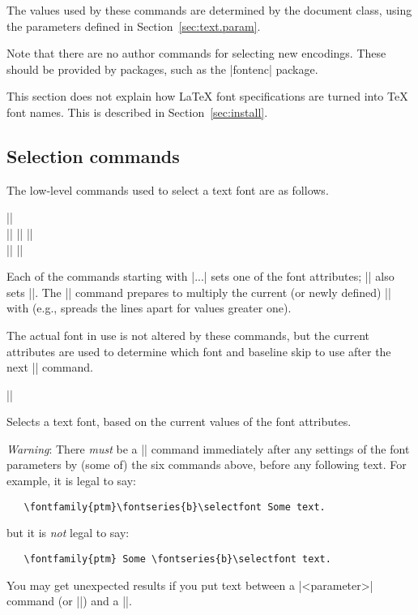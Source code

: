\documentclass{ltxguide}[1995/11/28]
\begin{document}
The values used by these commands are determined by the document class,
using the parameters defined in Section~\ref{sec:text.param}.

Note that there are no author commands for selecting new encodings.
These should be provided by packages, such as the |fontenc| package.

This section does not explain how \LaTeX{} font specifications are
turned into \TeX{} font names.  This is described in
Section~\ref{sec:install}.



\subsection{Selection commands}

The low-level commands used to select a text font are as follows.

\begin{decl}
  |\fontencoding|  \\
  |\fontfamily|   \qquad
  |\fontseries|  \qquad
  |\fontshape|  \\
  |\fontsize|   \qquad
  |\linespread| 
\end{decl}

Each of the commands starting with |\font...| sets one of the font
attributes; |\fontsize| also sets |\baselineskip|. The |\linespread|
command prepares to multiply the current (or newly defined)
|\baselineskip| with  (e.g., spreads the lines apart for
values greater one).

The actual font in use is not altered by these commands, but the
current attributes are used to determine which font and baseline skip
to use after the next |\selectfont| command.

\begin{decl}
  |\selectfont|
\end{decl}
Selects a text font, based on the current values of the font attributes.

\emph{Warning}: There \emph{must} be a |\selectfont| command immediately
after any settings of the font parameters by (some of) the six commands
above, before any following text.  For example, it is legal to say:
\begin{verbatim}
   \fontfamily{ptm}\fontseries{b}\selectfont Some text.
\end{verbatim}
but it is \emph{not} legal to say:
\begin{verbatim}
   \fontfamily{ptm} Some \fontseries{b}\selectfont text.
\end{verbatim}
You may get unexpected results if you put text between a
|\font<parameter>| command (or |\linespread|) and a |\selectfont|.
\end{document}
